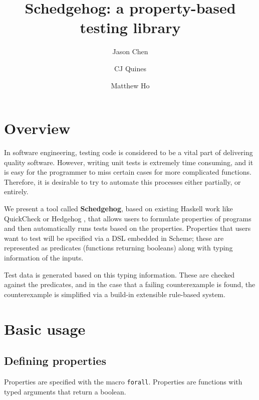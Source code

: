 \documentclass{scrartcl}
\title{Schedgehog: a property-based testing library}
\author{Jason Chen \and CJ Quines \and Matthew Ho}
\begin{document}
\maketitle

\section{Overview}

In software engineering, testing code is considered to be a vital part of
delivering quality software. However, writing unit tests is extremely time
consuming, and it is easy for the programmer to miss certain cases for more
complicated functions. Therefore, it is desirable to try to automate this
processes either partially, or entirely.

We present a tool called \textbf{Schedgehog}, based on existing Haskell work
like QuickCheck \cite{quickcheck} or Hedgehog \cite{hedgehog}, that allows
users to formulate properties of programs and then automatically runs tests
based on the properties. Properties that users want to test will be specified
via a DSL embedded in Scheme; these are represented as predicates (functions
returning booleans) along with typing information of the inputs.

Test data is generated based on this typing information. These are checked
against the predicates, and in the case that a failing counterexample is found,
the counterexample is simplified via a build-in extensible rule-based system.

\iffalse
Schedgehog's generators
are generic functions associated with a type that serve two main purposes:
\begin{itemize}
  \item \emph{value generation}, which is the generation of new value of
        the type given size and seed parameters, and
  \item \emph{test shrinking}, which allows automatically simplifying failing
        counterexamples, via a built-in user-extensible rule-based system.
\end{itemize}
\fi

\section{Basic usage}

\subsection{Defining properties}
Properties are specified with the macro \verb|forall|. Properties are functions
with typed arguments that return a boolean.
\end{document}
